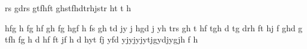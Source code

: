 rs
gdrs
gtfhft
ghstfhdtrhjstr
ht
t
h



hfg
h
fg
hf
gh
fg
hgf
h
fs
gh
td
jy
j
hgd
j
yh
trs
gh
t
hf
tgh
d
tg
drh
ft
hj
f
ghd
g
tfh
fg
h
d
hf
ft
jf
h
d
hyt
fj
yfd
yjyjyjytjgydjygjh
f
h





